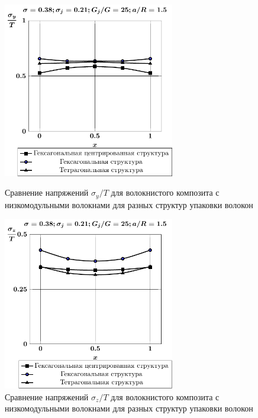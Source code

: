 %

\begin{figure}[h!]
\centering\footnotesize
\parbox[b]{7.5cm}{\centering\includegraphics[width=7.5cm]{inc7-6-4-sig_y.pdf}
\caption{Сравнение напряжений $\sigma_y/T$ для волокнистого композита с низкомодульными волокнами для разных структур упаковки волокон
\label{f:7:72}}}\hfil\hfil
\parbox[b]{7.5cm}{\centering\includegraphics[width=7.5cm]{inc7-6-4-sig_z.pdf}
\caption{Сравнение напряжений $\sigma_z/T$ для волокнистого композита с низкомодульными волокнами для разных структур упаковки волокон
\label{f:7:73}}}
\end{figure}

